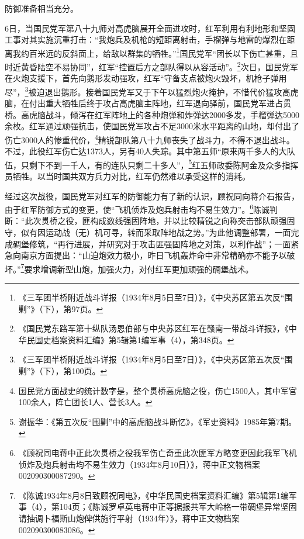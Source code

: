 防御准备相当充分。


6日，当国民党军第八十九师对高虎脑展开全面进攻时，红军利用有利地形和坚固工事对其实施沉重打击：“我炮兵及机枪的短距离射击，手榴弹与地雷的爆烈在距离我约百米远的反斜面上，给敌以群集的牺牲。”\footnote{《三军团半桥附近战斗详报（1934年8月5日至7日）》，《中央苏区第五次反“围剿”》（下），第97页。}国民党军“团长以下伤亡甚重，且时近黄昏陆空不易协同”，红军“控置后方之部队得以从容活动”。\footnote{《国民党东路军第十纵队汤恩伯部与中央苏区红军在赣南一带战斗详报》，《中华民国史档案资料汇编》第5辑第1编军事（4），第348页。}次日，国民党军在火炮支援下，首先向鹅形发动强攻，红军“守备支点被炮火毁坏，机枪子弹用尽”，\footnote{《三军团半桥附近战斗详报（1934年8月5日至7日）》，《中央苏区第五次反“围剿”》（下），第100页。}被迫退出鹅形。接着国民党军又于下午以猛烈炮火掩护，不惜代价猛攻高虎脑，在付出重大牺牲后终于攻占高虎脑主阵地，红军退向驿前，国民党军进占贯桥。高虎脑战斗，倾泻在红军阵地上的各种炮弹和炸弹达2000多发，手榴弹达5000余枚。红军通过顽强抗击，使国民党军攻占不足3000米水平距离的山地，却付出了伤亡3000人的惨重代价，\footnote{国民党方面战史的统计数字是，整个贯桥高虎脑之役，伤亡1500人，其中军官100余人，阵亡团长1人、营长3人。}精锐部队第八十九师丧失了战斗力，不得不退出战斗。不过，此役红军伤亡达1373人，另有40人失踪。其中第五师“原来两千多人的大队伍，只剩下不到一千人，有的连队只剩二十多人”，\footnote{谢振华：《第五次反“围剿”中的高虎脑战斗断忆》，《军史资料》1985年第7期。}红五师政委陈阿金及众多指挥员牺牲。以当时国共双方兵力对比，红军仍然难以承受这样的消耗。


经过这次战役，国民党军对红军的防御能力有了新的认识，顾祝同向蒋介石报告，由于红军防御方式的变更，使“飞机侦炸及炮兵射击均不易生效力”。\footnote{《顾祝同电蒋中正此次贯桥之役我军伤亡奇重此次匪军方略变更因此我军飞机侦炸及炮兵射击均不易生效力（1934年8月10日）》，蒋中正文物档案002090300087290。}陈诚判断：“此次贯桥之役，匪构成数线强固阵地，并以比较精锐之向称突击部队顽强固守，似有因运动战（无）机可寻，转而采取阵地战之势。”为此他调整部署，一面完成碉堡修筑，“再行进展，并研究对于攻击匪强固阵地之对策，以利作战”；一面紧急向南京方面提出：“山迫炮效力极小，昨日飞机轰炸命中非常精确亦不能予以破坏。”\footnote{《陈诚1934年8月8日致顾祝同电》，《中华民国史档案资料汇编》第5辑第1编军事（4），第104页；《陈诚罗卓英电蒋中正等据报共军大岭格一带碉堡异常坚固请抽调卜福斯山炮俾供施行平射（1934年）》，蒋中正文物档案002090300083086。}要求增调新型山炮，加强火力，对付红军更加顽强的碉堡战术。


